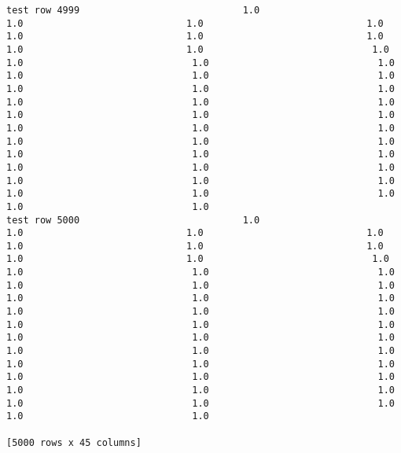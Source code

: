 \documentclass[11pt]{article}
\begin{document}
\begin{verbatim}
test row 4999                             1.0                             1.0                             1.0                             1.0                             1.0                             1.0                             1.0                             1.0                             1.0                              1.0                              1.0                              1.0                              1.0                              1.0                              1.0                              1.0                              1.0                              1.0                              1.0                              1.0                              1.0                              1.0                              1.0                              1.0                              1.0                              1.0                              1.0                              1.0                              1.0                              1.0                              1.0                              1.0                              1.0                              1.0                              1.0                              1.0                              1.0                              1.0                              1.0                              1.0                              1.0                              1.0                              1.0                              1.0                              1.0
test row 5000                             1.0                             1.0                             1.0                             1.0                             1.0                             1.0                             1.0                             1.0                             1.0                              1.0                              1.0                              1.0                              1.0                              1.0                              1.0                              1.0                              1.0                              1.0                              1.0                              1.0                              1.0                              1.0                              1.0                              1.0                              1.0                              1.0                              1.0                              1.0                              1.0                              1.0                              1.0                              1.0                              1.0                              1.0                              1.0                              1.0                              1.0                              1.0                              1.0                              1.0                              1.0                              1.0                              1.0                              1.0                              1.0

[5000 rows x 45 columns]
    \end{verbatim}
\end{document}
